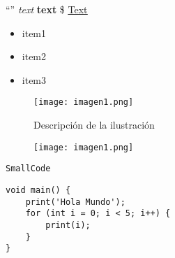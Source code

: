 
“”                                         %
\textit {text}                             %
\textbf{text}                              %
\$                                         %
\href{url}{\color{blue}\underline{Text}}   %
\begin{itemize}
    \item item1
    
    \item item2
    
    \item item3
\end{itemize}

\begin{figure}[H]
    \centering
    \texttt{[image: imagen1.png]}
    \caption{Descripción de la ilustración}
    \label{fig:reference}
\end{figure}


\begin{figure}[H]
    \centering
    \texttt{[image: imagen1.png]}
\end{figure}


\parencite{NameOfTheAuthor}


\lstinline{SmallCode}


\begin{center}
\begin{lstlisting}
void main() {
    print('Hola Mundo');
    for (int i = 0; i < 5; i++) {
        print(i);
    }
}
\end{lstlisting}
\end{center}
